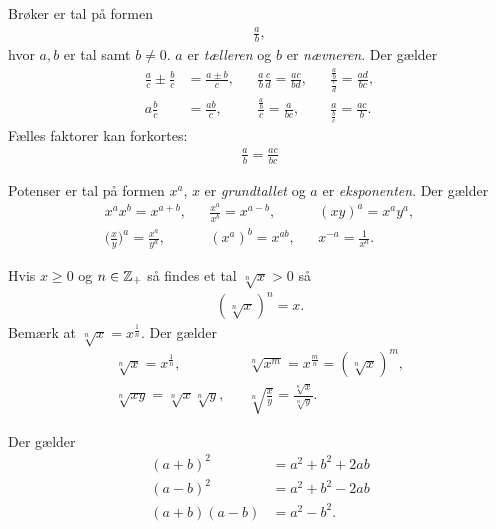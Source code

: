 Brøker er tal på formen
\begin{align*}
\frac{a}{b},
\end{align*}
hvor $a,b$ er tal samt $b\neq 0$. $a$ er \emph{tælleren} og $b$ er \emph{nævneren}.
Der gælder
\begin{align*}
\frac{a}{c}\pm\frac{b}{c}&=\frac{a\pm b}{c},&&\frac{a}{b}\frac{c}{d}=\frac{ac}{bd},&&\frac{\frac{a}{b}}{\frac{c}{d}}=\frac{ad}{bc},\\
a\frac{b}{c}&=\frac{ab}{c},&&\frac{\frac{a}{b}}{c}=\frac{a}{bc},&&\frac{a}{\frac{b}{c}}=\frac{ac}{b}.
\end{align*}
Fælles faktorer kan forkortes:
\begin{align*}
\frac{a}{b}=\frac{ac}{bc}
\end{align*}

Potenser er tal på formen $x^a$, 
$x$ er \emph{grundtallet} og $a$ er \emph{eksponenten}.
Der gælder
\begin{align*}
x^ax^b=x^{a+b},&& \frac{x^a}{x^b}=x^{a-b},&&(xy)^a=x^ay^a,\\
\Big(\frac{x}{y}\Big)^a=\frac{x^a}{y^a},&&(x^a)^b=x^{ab},&& x^{-a}=\frac{1}{x^a}.
\end{align*}

Hvis $x\geq 0$ og $n\in \mathbb{Z}_+$ så findes et tal $\sqrt[n]{x}>0$ så
\begin{align*}
(\sqrt[n]{x})^n=x.
\end{align*}
Bemærk at $\sqrt[n]{x}=x^{\frac{1}{n}}$.
Der gælder
\begin{align*}
\sqrt[n]{x}=x^{\frac{1}{n}},&& \sqrt[n]{x^m}=x^{\frac{m}{n}}=(\sqrt[n]{x})^m,\\
\sqrt[n]{xy}=\sqrt[n]{x}\sqrt[n]{y},&& \sqrt[n]{\frac{x}{y}}=\frac{\sqrt[n]{x}}{\sqrt[n]{y}}.
\end{align*}

Der gælder
\begin{align*}
(a+b)^2&=a^2+b^2+2ab\\
(a-b)^2&=a^2+b^2-2ab\\
(a+b)(a-b)&=a^2-b^2.
\end{align*}
